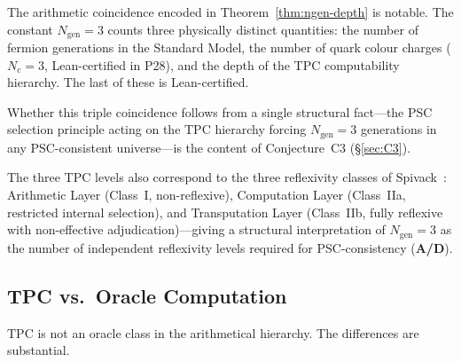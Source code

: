 \documentclass[12pt,letterpaper]{article}
\newcommand{\TPC}{\mathrm{TPC}}
\newcommand{\ngen}{N_{\mathrm{gen}}}
\newcommand{\catAD}{\textbf{A/D}}
\begin{document}
The arithmetic coincidence encoded in Theorem~\ref{thm:ngen-depth} is notable.
The constant $\ngen = 3$ counts three physically distinct quantities: the number
of fermion generations in the Standard Model, the number of quark colour charges
($N_c = 3$, Lean-certified in P28), and the depth of the TPC computability
hierarchy.  The last of these is Lean-certified.

Whether this triple coincidence follows from a single structural fact---the PSC
selection principle acting on the TPC hierarchy forcing $\ngen = 3$ generations in
any PSC-consistent universe---is the content of Conjecture~C3 (\S\ref{sec:C3}).

The three TPC levels also correspond to the three reflexivity classes of
Spivack~\cite{SpivackReflexiveLaw}: Arithmetic Layer (Class~I, non-reflexive),
Computation Layer (Class~IIa, restricted internal selection), and Transputation
Layer (Class~IIb, fully reflexive with non-effective adjudication)---giving a
structural interpretation of $\ngen = 3$ as the number of independent reflexivity
levels required for PSC-consistency (\catAD).

\subsection{TPC vs.\ Oracle Computation}
\label{sec:tpc-oracle}

$\TPC$ is not an oracle class in the arithmetical hierarchy.  The differences
are substantial.
\end{document}
